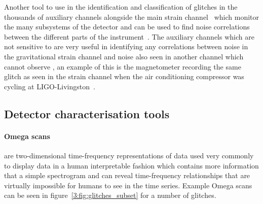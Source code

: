 
Another tool to use in the identification and classification of glitches in the thousands of auxiliary channels alongside the main strain channel~\cite{iDQ:2020} which monitor the many subsystems of the detector and can be used to find noise correlations between the different parts of the instrument~\cite{DQ_vetoes:2017}. The auxiliary channels which are not sensitive to \gws are very useful in identifying any correlations between noise in the gravitational strain channel and noise also seen in another channel which cannot observe \gws, an example of this is the magnetometer recording the same glitch as seen in the \gwadj strain channel when the air conditioning compressor was cycling at LIGO-Livingston~\cite{Nuttall:2018}.

\subsection{\label{3:sec:detchar-tools}Detector characterisation tools}

\paragraph{Omega scans}

are two-dimensional time-frequency representations of \gwadj data used very commonly to display \gwadj data in a human interpretable fashion which contains more information that a simple spectrogram and can reveal time-frequency relationships that are virtually impossible for humans to see in the time series. Example Omega scans can be seen in figure~\ref{3:fig:glitches_subset} for a number of glitches.

